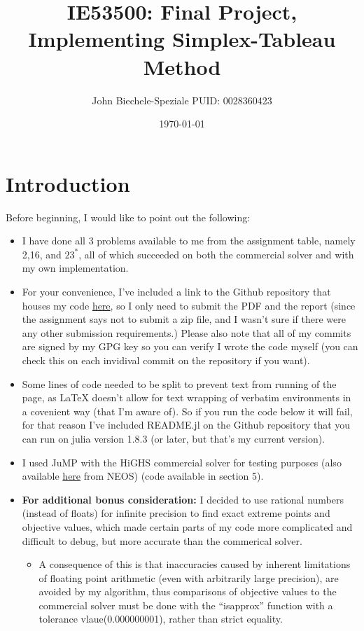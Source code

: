 \documentclass[11pt]{article}
\author{John Biechele-Speziale PUID: 0028360423}
\date{\today}
\title{IE53500: Final Project, Implementing Simplex-Tableau Method}
\begin{document}
\maketitle

\section{Introduction}
\label{sec:orgd00151e}
Before beginning, I would like to point out the following:
\begin{itemize}
\item I have done all 3 problems available to me from the assignment table, namely 2,16, and \(23^{*}\), all of which succeeded on both the commercial solver and with my own implementation.
\item For your convenience, I've included a link to the Github repository that houses my code \href{https://github.com/johnabs/IE535Project}{here}, so I only need to submit the PDF and the report (since the assignment says not to submit a zip file, and I wasn't sure if there were any other submission requirements.) Please also note that all of my commits are signed by my GPG key so you can verify I wrote the code myself (you can check this on each invidival commit on the repository if you want).
\item Some lines of code needed to be split to prevent text from running of the page, as \LaTeX{} doesn't allow for text wrapping of verbatim environments in a covenient way (that I'm aware of). So if you run the code below it will fail, for that reason I've included README.jl on the Github repository that you can run on julia version 1.8.3 (or later, but that's my current version).
\item I used JuMP with the HiGHS commercial solver for testing purposes (also available \href{https://neos-server.org/neos/solvers/lp:HiGHS/LP.html}{here} from NEOS) (code available in section 5).
\item \textbf{For additional bonus consideration:} I decided to use rational numbers (instead of floats) for infinite precision to find exact extreme points and objective values, which made certain parts of my code more complicated and difficult to debug, but more accurate than the commerical solver.
\begin{itemize}
\item A consequence of this is that inaccuracies caused by inherent limitations of floating point arithmetic (even with arbitrarily large precision), are avoided by my algorithm, thus comparisons of objective values to the commercial solver must be done with the ``isapprox'' function with a tolerance vlaue(0.000000001), rather than strict equality.
\end{itemize}
\end{itemize}
\end{document}
